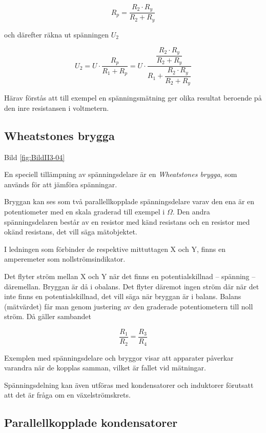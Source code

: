 \[
R_p = \frac{R_2 \cdot R_y}{R_2 + R_y}
\]

och därefter räkna ut spänningen \(U_2\) 

\[
U_2 = U \cdot \dfrac{ R_p }{ R_1 + R_p } = U \cdot \dfrac{ \dfrac{R_2 \cdot R_y}{R_2 + R_y} }{ R_1 + \dfrac{R_2 \cdot R_y}{R_2 + R_y} }
\]

Härav förstås att till exempel en spänningsmätning ger olika resultat beroende
på den inre resistansen i voltmetern.

\subsection{Wheatstones brygga}


Bild \ref{fig:BildII3-04}

En speciell tillämpning av spänningsdelare är en \emph{Wheatstones brygga},
som används för att jämföra spänningar.

Bryggan kan ses som två parallellkopplade spänningsdelare varav den ena är en
potentiometer med en skala graderad till exempel i \(\Omega\).
Den andra spänningsdelaren består av en resistor med känd resistans och en
resistor med okänd resistans, det vill säga mätobjektet.

I ledningen som förbinder de respektive mittuttagen X och Y, finns en
amperemeter som nollströmsindikator.

Det flyter ström mellan X och Y när det finns en potentialskillnad -- spänning
-- däremellan.
Bryggan är då i obalans.
Det flyter däremot ingen ström där när det inte finns en potentialskillnad,
det vill säga när bryggan är i balans.
Balans (mätvärdet) får man genom justering av den graderade potentiometern
till noll ström.
Då gäller sambandet

\[\frac{R_1}{R_2} = \frac{R_3}{R_4}\]

Exemplen med spänningsdelare och bryggor visar att apparater påverkar varandra när de kopplas samman, vilket är fallet vid mätningar.

Spänningsdelning kan även utföras med kondensatorer och induktorer förutsatt att det är fråga om en växelströmskrets.

\subsection{Parallellkopplade kondensatorer}

